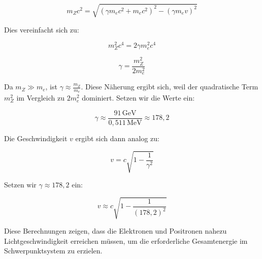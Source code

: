 \[
m_Z c^2 = \sqrt{(\gamma m_e c^2 + m_e c^2)^2 - (\gamma m_e v)^2}
\]

Dies vereinfacht sich zu:

\[
m_Z^2 c^4 = 2 \gamma m_e^2 c^4
\]

\[
\gamma = \frac{m_Z^2}{2 m_e^2}
\]

Da \( m_Z \gg m_e \), ist \( \gamma \approx \frac{m_Z}{m_e} \). Diese Näherung ergibt sich, weil der quadratische Term \( m_Z^2 \) im Vergleich zu \( 2 m_e^2 \) dominiert. Setzen wir die Werte ein:

\[
\gamma \approx \frac{91 \, \text{GeV}}{0{,}511 \, \text{MeV}} \approx 178{,}2
\]

Die Geschwindigkeit \( v \) ergibt sich dann analog zu:

\[
v = c \sqrt{1 - \frac{1}{\gamma^2}}
\]

Setzen wir \( \gamma \approx 178{,}2 \) ein:

\[
v \approx c \sqrt{1 - \frac{1}{(178{,}2)^2}}
\]

Diese Berechnungen zeigen, dass die Elektronen und Positronen nahezu Lichtgeschwindigkeit erreichen müssen, um die erforderliche Gesamtenergie im Schwerpunktsystem zu erzielen.